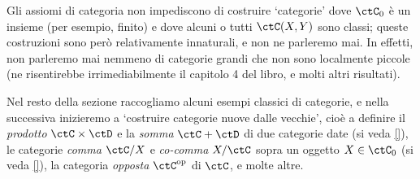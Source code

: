\begin{remark}
	Gli assiomi di categoria non impediscono di costruire `categorie' dove \(\ctC_0\) è un insieme (per esempio, finito) e dove alcuni o tutti \(\Hom{\ctC}(X,Y)\) sono classi; queste costruzioni sono però relativamente innaturali, e non ne parleremo mai. In effetti, non parleremo mai nemmeno di categorie grandi che non sono localmente piccole (ne risentirebbe irrimediabilmente il capitolo 4 del libro, e molti altri risultati).
\end{remark}
Nel resto della sezione raccogliamo alcuni esempi classici di categorie, e nella successiva inizieremo a `costruire categorie nuove dalle vecchie', cioè a definire il \emph{prodotto} \(\ctC\times\ctD\) e la \emph{somma} \(\ctC+\ctD\) di due categorie date (si veda \ref{}), le categorie \emph{comma} \(\ctC/X\) e \emph{co-comma} \(X/\ctC\) sopra un oggetto \(X\in\ctC_0\) (si veda \ref{}), la categoria \emph{opposta} \(\ctC^\op\) di \(\ctC\), e molte altre.

